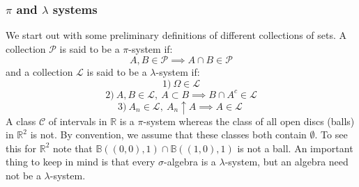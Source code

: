 \documentclass{article}
\begin{document}
\subsubsection{$\pi$ and $\lambda$ systems}
We start out with some preliminary definitions of different collections of sets. A collection $\mathcal{P}$ is said to be a $\pi$-system if: 
\[
A,B \in \mathcal{P} \implies A \cap B \in \mathcal{P}
\]
and a collection $\mathcal{L}$ is said to be a $\lambda$-system if: 
\[
1) \ \Omega\in \mathcal{L}
\]
\[
2) \ A,B \in \mathcal{L}, \ A\subset B \implies B \cap A^c \in \mathcal{L}
\]
\[
3) \ A_n\in \mathcal{L}, \ A_n \uparrow A \implies A \in \mathcal{L} \ 
\]
A class $\mathcal{C}$ of intervals in $\mathbb{R}$ is a $\pi$-system whereas the class of all open discs (balls) in $\mathbb{R}^2$ is not. By convention, we assume that these classes both contain $\emptyset$. To see this for $\mathbb{R}^2$ note that $\mathbb{B}((0,0),1)\cap\mathbb{B}((1,0),1)$ is not a ball. \newline \newline
An important thing to keep in mind is that every $\sigma$-algebra is a $\lambda$-system, but an algebra need not be a $\lambda$-system.
\end{document}
